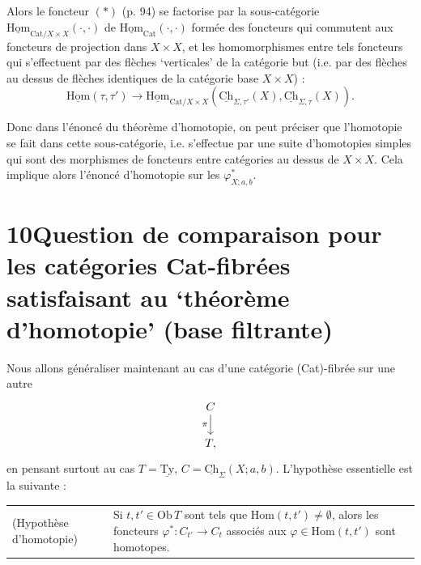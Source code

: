 \documentclass[11pt]{article}
\newcommand{\printedpage}[1]{\marginpar{\footnotesize p.~#1}}
\newcommand{\msp}[1]{\marginpar{\vspace*{10pt}\footnotesize [#1]}}
\newcommand{\uTy}{\underline{\mathrm{Ty}}}
\newcommand{\Hom}{\mathrm{Hom}}
\newcommand{\uHom}{\underline{\mathrm{Hom}}}
\newcommand{\uCh}{\underline{\mathrm{Ch}}}
\newcommand{\Ob}{\mathrm{Ob}\,}
\begin{document}
Alors le foncteur $(*)$ (p. 94) se factorise par la sous-catégorie $\uHom_{\mathrm{Cat}/X\times X}(\cdot,\cdot)$ de $\uHom_{\mathrm{Cat}}(\cdot,\cdot)$ formée des foncteurs qui commutent aux foncteurs de projection dans $X\times X$, et les homomorphismes entre tels foncteurs qui s'effectuent par des flèches `verticales' de la catégorie but (i.e. par des flèches au dessus de flèches identiques de la catégorie base $X\times X$) :
\[
\uHom(\tau,\tau')\longrightarrow\uHom_{\mathrm{Cat}/X\times X}(\uCh_{\Sigma,\tau'}(X),\uCh_{\Sigma,\tau}(X)).
\]

Donc dans l'énoncé du théorème d'homotopie, on peut préciser que l'homotopie se fait dans cette sous-catégorie, i.e. s'effectue par une suite d'homotopies simples qui sont des morphismes de foncteurs entre catégories au dessus de $X\times X$. Cela implique alors l'énoncé d'homotopie sur les $\varphi^*_{X;a,b}$.

\leavevmode\printedpage{64}
\msp{page 99}

\section*{10\quad Question de comparaison pour les catégories \textmd{Cat}-fibrées satisfaisant au ‘théorème d'homotopie' (base filtrante)}

Nous allons généraliser maintenant au cas d'une catégorie (Cat)-fibrée sur une autre
\[
\begin{tikzcd}
C \arrow[d, "\pi"'] \\
T,
\end{tikzcd}
\]
en pensant surtout au cas $T = \uTy$, $C = \uCh_{\Sigma}(X;a,b)$. L'hypothèse essentielle est la suivante :

\noindent\begin{tabular}{@{}p{}p{}@{}}
(Hypothèse d'homotopie) & Si $t,t' \in \Ob T$ sont tels que $\Hom(t,t') \neq \emptyset$, alors les foncteurs $\varphi^{*} : C_{t'} \longrightarrow C_{t}$ associés aux $\varphi \in \Hom(t,t')$ sont homotopes.
\end{tabular}
\end{document}
